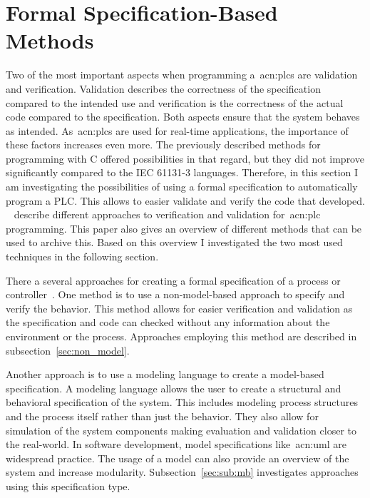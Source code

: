 \chapter{Formal Specification-Based Methods}
\label{sec:formal_methods}

Two of the most important aspects when programming a~\glspl{acn:plc} are validation and verification.
Validation describes the correctness of the specification compared to the intended use and verification is the correctness of the actual code compared to the specification.
Both aspects ensure that the system behaves as intended.
As~\glspl{acn:plc} are used for real-time applications, the importance of these factors increases even more.
The previously described methods for programming with C offered possibilities in that regard, but they did not improve significantly compared to the IEC 61131-3 languages.
Therefore, in this section I am investigating the possibilities of using a formal specification to automatically program a PLC.
This allows to easier validate and verify the code that developed.
\citeauthor{Frey:2000aa}~\cite{Frey:2000aa} describe different approaches to verification and validation for~\acrshort{acn:plc} programming.
This paper also gives an overview of different methods that can be used to archive this.
Based on this overview I investigated the two most used techniques in the following section.

There a several approaches for creating a formal specification of a process or controller~\cite{Frey:2000aa}.
One method is to use a non-model-based approach to specify and verify the behavior.
This method allows for easier verification and validation as the specification and code can checked without any information about the environment or the process.
Approaches employing this method are described in subsection~\ref{sec:non_model}.

Another approach is to use a modeling language to create a model-based specification.
A modeling language allows the user to create a structural and behavioral specification of the system.
This includes modeling process structures and the process itself rather than just the behavior.
They also allow for simulation of the system components making evaluation and validation closer to the real-world.
In software development, model specifications like~\acrfull{acn:uml} are widespread practice.
The usage of a model can also provide an overview of the system and increase modularity.
Subsection~\ref{sec:sub:mb} investigates approaches using this specification type.

